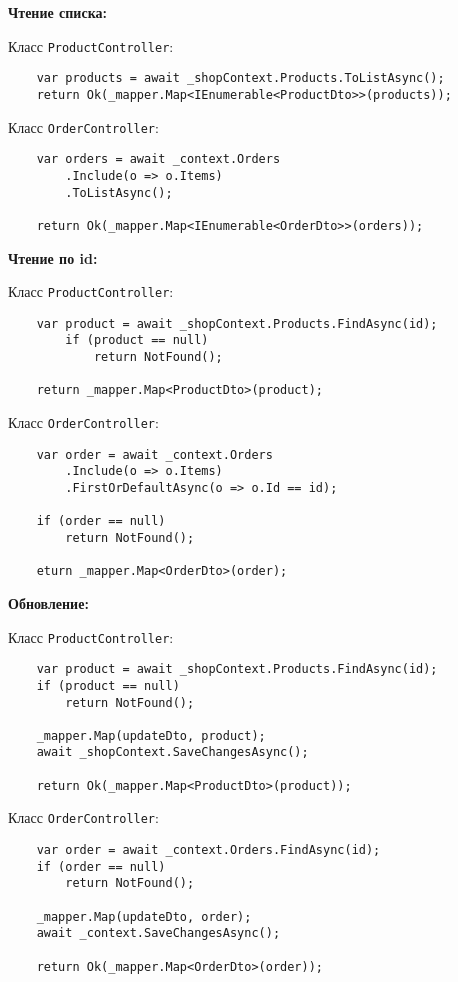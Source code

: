 \documentclass[a4paper,12pt]{report}
\begin{document}
\textbf{Чтение списка:}

Класс \texttt{ProductController}:
\begin{verbatim}
    var products = await _shopContext.Products.ToListAsync();
    return Ok(_mapper.Map<IEnumerable<ProductDto>>(products));
\end{verbatim}

Класс \texttt{OrderController}:
\begin{verbatim}
    var orders = await _context.Orders
        .Include(o => o.Items)
        .ToListAsync();

    return Ok(_mapper.Map<IEnumerable<OrderDto>>(orders));
\end{verbatim}

\textbf{Чтение по id:}

Класс \texttt{ProductController}:
\begin{verbatim}
    var product = await _shopContext.Products.FindAsync(id);
        if (product == null)
            return NotFound();

    return _mapper.Map<ProductDto>(product);
\end{verbatim}

Класс \texttt{OrderController}:
\begin{verbatim}
    var order = await _context.Orders
        .Include(o => o.Items)
        .FirstOrDefaultAsync(o => o.Id == id);

    if (order == null)
        return NotFound();

    eturn _mapper.Map<OrderDto>(order);
\end{verbatim}

\textbf{Обновление:}

Класс \texttt{ProductController}:
\begin{verbatim}
    var product = await _shopContext.Products.FindAsync(id);
    if (product == null)
        return NotFound();

    _mapper.Map(updateDto, product);
    await _shopContext.SaveChangesAsync();

    return Ok(_mapper.Map<ProductDto>(product));
\end{verbatim}

Класс \texttt{OrderController}:
\begin{verbatim}
    var order = await _context.Orders.FindAsync(id);
    if (order == null)
        return NotFound();

    _mapper.Map(updateDto, order);
    await _context.SaveChangesAsync();

    return Ok(_mapper.Map<OrderDto>(order));
\end{verbatim}
\end{document}
